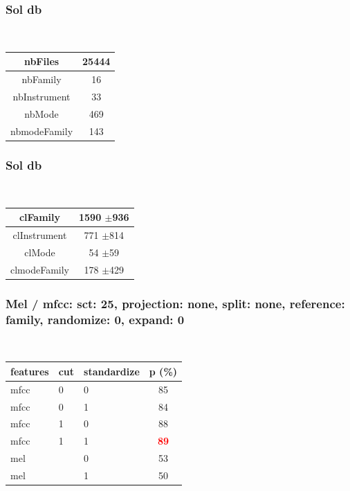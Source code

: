 \documentclass{beamer}
\begin{document}
\begin{frame}\frametitle{Sol db}

\begin{table}
\begin{center}
\
\setlength{\tabcolsep}{.16667em}
\begin{tabular}{cc}
nbFiles & 25444 \\
\hline
nbFamily & 16 \\
nbInstrument & 33 \\
nbMode & 469 \\
nbmodeFamily & 143 \\
\end{tabular}
\end{center}
\label{fenuSc25}
\end{table}

\end{frame}
\begin{frame}\frametitle{Sol db}

\begin{table}
\begin{center}
\
\setlength{\tabcolsep}{.16667em}
\begin{tabular}{cc}
clFamily & 1590 $\pm$936 \\
\hline
clInstrument & 771 $\pm$814 \\
clMode & 54 $\pm$59 \\
clmodeFamily & 178 $\pm$429 \\
\end{tabular}
\end{center}
\label{fenuSc25}
\end{table}

\end{frame}
\begin{frame}\frametitle{Mel / mfcc: sct: 25, projection: none, split: none, reference: family, randomize: 0, expand: 0}

\begin{table}
\begin{center}
\
\setlength{\tabcolsep}{.16667em}
\begin{tabular}{lllc}
features & cut & standardize & p (\%) \\
\hline
mfcc & 0 & 0 & 85 \\
mfcc & 0 & 1 & 84 \\
mfcc & 1 & 0 & 88 \\
mfcc & 1 & 1 & \textbf{\textcolor{red}{89}} \\
mel &  & 0 & 53 \\
mel &  & 1 & 50 \\
\end{tabular}
\end{center}
\label{sc25PrnoSpnoRefaRa0Ex0}
\end{table}

\end{frame}
\end{document}
